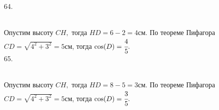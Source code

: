 \documentclass[12pt]{article}
\begin{document}
64. \begin{figure}[ht!]
\end{figure}\\
Опустим высоту $CH,$ тогда $HD=6-2=4$см. По теореме Пифагора $CD=\sqrt{4^2+3^2}=5$см, тогда $\cos(D)=\cfrac{4}{5}.$\\
65. \begin{figure}[ht!]
\end{figure}\\
Опустим высоту $CH,$ тогда $HD=8-5=3$см. По теореме Пифагора $CD=\sqrt{4^2+3^2}=5$см, тогда $\cos(D)=\cfrac{3}{5}.$\\
\end{document}

